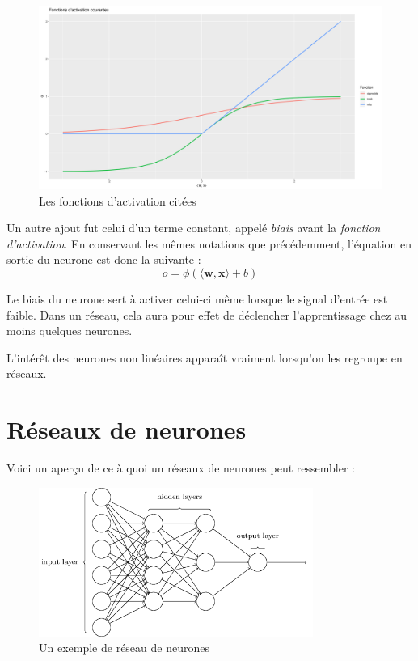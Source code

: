 \begin{figure}[H]
\centering
\includegraphics[width=\textwidth]{img/activations.png}
\caption{Les fonctions d'activation citées}
\label{fig:activations}
\end{figure}

Un autre ajout fut celui d'un terme constant, appelé \emph{biais} avant la \emph{fonction d'activation}. En conservant les mêmes notations que précédemment, l'équation en sortie du neurone est donc la suivante : 
\begin{equation}\label{eq:neurone}
o = \phi(\langle \boldsymbol{w}, \boldsymbol{x} \rangle + b)
\end{equation}

Le biais du neurone sert à activer celui-ci même lorsque le signal d'entrée est faible. Dans un réseau, cela aura pour effet de déclencher l'apprentissage chez au moins quelques neurones.

L'intérêt des neurones non linéaires apparaît vraiment lorsqu'on les regroupe en réseaux.

\section{Réseaux de neurones}
Voici un aperçu de ce à quoi un réseaux de neurones peut ressembler :

\begin{figure}[H]
\centering
\includegraphics[width=0.8\textwidth]{img/reseau_neurones.png}
\caption{Un exemple de réseau de neurones}
\label{fig:ffnn}
\end{figure}


